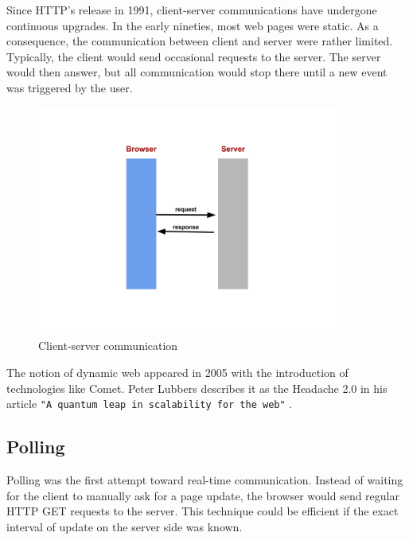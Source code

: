 Since HTTP's release in 1991, client-server communications have undergone
continuous upgrades. In the early nineties, most web pages were static. As a
consequence, the communication between client and server  were rather limited.
Typically, the client would send occasional requests to the server. The server
would then answer, but all communication would stop there until a new event was
triggered by the user. 


\begin{figure}[H]
\centering
\includegraphics[width=0.9\textwidth]{./Figures/client_server_communication.png}
\caption[Client-server communication]{Client-server communication}
\label{fig:client_server_communication}
\end{figure}

The notion of dynamic web appeared in 2005 with the introduction of technologies
like Comet. Peter Lubbers describes it as the Headache 2.0 in his article
\texttt{"A quantum leap in scalability for the web"} \citep{Reference32}.

\subsection{Polling}

Polling was the first attempt toward real-time communication. Instead of waiting
for the client to manually ask for a page update, the browser would send regular
HTTP GET requests to the server. This technique could be efficient if the exact
interval of update on the server side was known.

